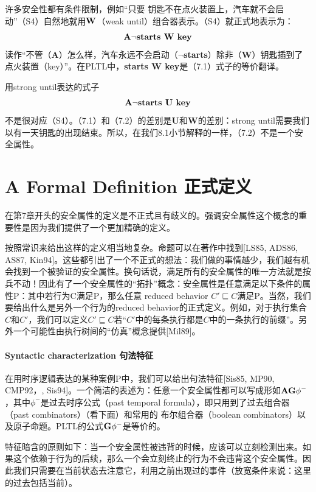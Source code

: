 \documentclass{book}
\begin{document}
    许多安全性都有条件限制，例如“只要 钥匙不在点火装置上，汽车就不会启动”（S4）自然地就用$\text{\textbf{W}}$（weak until）组合器表示。（S4）就正式地表示为：
    \begin{equation}\label{}
      \text{\textbf{A}}\neg\text{\textbf{starts W key}}
    \end{equation}
    读作“不管（\textbf{A}）怎么样，汽车永远不会启动（$\neg$\textbf{starts}）除非（\textbf{W}）钥匙插到了点火装置（key）”。在PLTL中，\textbf{starts W key}是（7.1）式子的等价翻译。

    用strong until表达的式子
    \begin{equation}\label{}
      \text{\textbf{A}}\neg\text{\textbf{starts U key}}
    \end{equation}
    不是很对应（S4）。（7.1）和（7.2）的差别是\textbf{U}和\textbf{W}的差别：strong until需要我们以有一天钥匙的出现结束。所以，在我们8.1小节解释的一样，（7.2）不是一个安全属性。

    \section{A Formal Definition 正式定义}
    在第7章开头的安全属性的定义是不正式且有歧义的。强调安全属性这个概念的重要性是因为我们提供了一个更加精确的定义。

    按照常识来给出这样的定义相当地复杂。命题可以在著作中找到[LS85, ADS86, AS87, Kin94]。这些都引出了一个不正式的想法：我们做的事情越少，我们越有机会找到一个被验证的安全属性。换句话说，满足所有的安全属性的唯一方法就是按兵不动！因此有了一个安全属性的“拓扑”概念：安全属性是任意满足以下条件的属性P：其中若行为C满足P，那么任意 reduced behavior $C'\sqsubseteq C$满足P。当然，我们要给出什么是另外一个行为的reduced behavior的正式定义。例如，对于执行集合$C$和$C'$，我们可以定义$C'\sqsubseteq C$若“$C'$中的每条执行都是$C$中的一条执行的前缀”。另外一个可能性由执行树间的“仿真”概念提供[Mil89]。

    \paragraph{Syntactic characterization 句法特征} 在用时序逻辑表达的某种案例P中，我们可以给出句法特征[Sis85, MP90, CMP92，, Sis94]。一个简洁的表述为：任意一个安全属性都可以写成形如$\text{\textbf{AG}}\phi^-$，其中$\phi^-$是过去时序公式（past temporal formula），即只用到了过去组合器（past combinators）（看下面）和常用的 布尔组合器（boolean combinators）以及原子命题。PLTL的公式$\text{\textbf{G}}\phi^-$是等价的。

    特征暗含的原则如下：当一个安全属性被违背的时候，应该可以立刻检测出来。如果这个依赖于行为的后续，那么一个会立刻终止的行为不会违背这个安全属性。因此我们只需要在当前状态去注意它，利用之前出现过的事件（放宽条件来说：这里的过去包括当前）。
\end{document}
